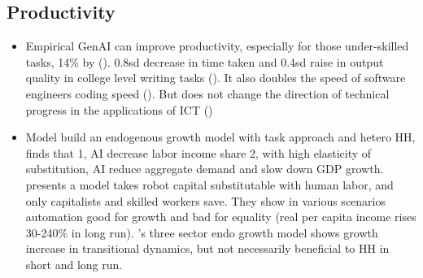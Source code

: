 \documentclass[10pt]{article} %
\begin{document}
    \subsection{Productivity}
    \begin{itemize}
        \item Empirical\newline
        GenAI can improve productivity, especially for those under-skilled tasks, 14\% by \cite{BrynjolfssonLiRaymond2023} (\cite{Damiolietal2021}). 0.8sd decrease in time taken and 0.4sd raise in output quality in college level writing tasks (\cite{NoyZhang2023}). It also doubles the speed of software engineers coding speed (\cite{Kalliamvakou2022}). But does not change the direction of technical progress in the applications of ICT (\cite{Bresnahan2021})
 
        \item Model\newline
        \cite{GriesNaude2020} build an endogenous growth model with task approach and hetero HH, finds that 1, AI decrease labor income share 2, with high elasticity of substitution, AI reduce aggregate demand and slow down GDP growth. \cite{BergBuffieZanna2018} presents a model takes robot capital substitutable with human labor, and only capitalists and skilled workers save. They show in various scenarios automation good for growth and bad for equality (real per capita income rises 30-240\% in long run). \cite{Lu2021}’s three sector endo growth model shows growth increase in transitional dynamics, but not necessarily beneficial to HH in short and long run.

    \end{itemize}
\end{document}
